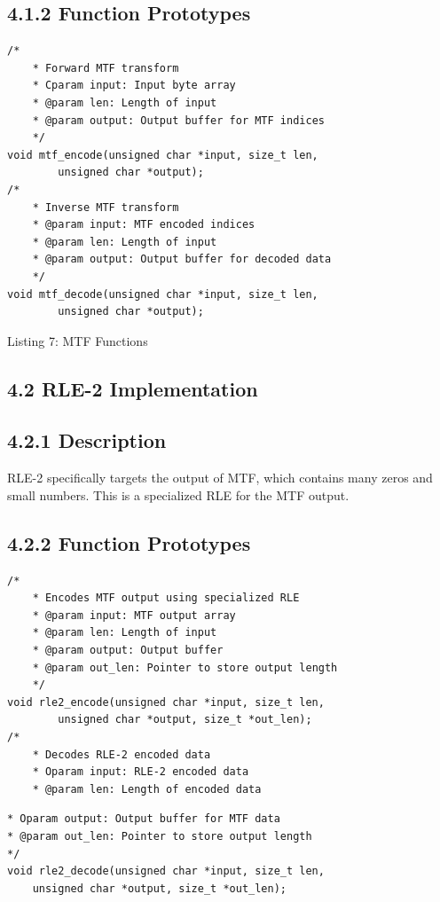 \documentclass[10pt]{article}
\begin{document}
\subsection*{4.1.2 Function Prototypes}
\begin{verbatim}
/*
    * Forward MTF transform
    * Cparam input: Input byte array
    * @param len: Length of input
    * @param output: Output buffer for MTF indices
    */
void mtf_encode(unsigned char *input, size_t len,
        unsigned char *output);
/*
    * Inverse MTF transform
    * @param input: MTF encoded indices
    * @param len: Length of input
    * @param output: Output buffer for decoded data
    */
void mtf_decode(unsigned char *input, size_t len,
        unsigned char *output);
\end{verbatim}

Listing 7: MTF Functions

\subsection*{4.2 RLE-2 Implementation}
\subsection*{4.2.1 Description}
RLE-2 specifically targets the output of MTF, which contains many zeros and small numbers. This is a specialized RLE for the MTF output.

\subsection*{4.2.2 Function Prototypes}
\begin{verbatim}
/*
    * Encodes MTF output using specialized RLE
    * @param input: MTF output array
    * @param len: Length of input
    * @param output: Output buffer
    * @param out_len: Pointer to store output length
    */
void rle2_encode(unsigned char *input, size_t len,
        unsigned char *output, size_t *out_len);
/*
    * Decodes RLE-2 encoded data
    * Oparam input: RLE-2 encoded data
    * @param len: Length of encoded data
\end{verbatim}

\begin{verbatim}
* Oparam output: Output buffer for MTF data
* @param out_len: Pointer to store output length
*/
void rle2_decode(unsigned char *input, size_t len,
    unsigned char *output, size_t *out_len);
\end{verbatim}
\end{document}
